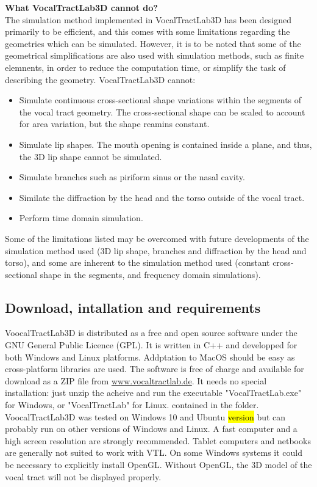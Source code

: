 \documentclass[]{article}
\begin{document}
	\textbf{What VocalTractLab3D cannot do?} \\
	The simulation method implemented in VocalTractLab3D has been 
	designed primarily to be efficient, and this comes with some 
	limitations regarding the geometries which can be simulated.
	However, it is to be noted that some of the geometrical simplifications are also used with simulation methods, such as finite
	elemnents, in order to reduce the computation time, or simplify the task of describing the geometry.
	VocalTractLab3D cannot:
	\begin{itemize}
		\item Simulate continuous cross-sectional shape variations within the segments of the vocal tract geometry. The cross-sectional shape can be scaled to account for area variation, but the shape reamins constant.
		\item Simulate lip shapes. The mouth opening is contained 
		inside a plane, and thus, the 3D lip shape cannot be simulated.
		\item Simulate branches such as piriform sinus or the nasal 
		cavity.
		\item Similate the diffraction by the head and the torso outside
		of the vocal tract.
		\item Perform time domain simulation.
	\end{itemize}
	Some of the limitations listed may be overcomed with future developments of the simulation method used (3D lip shape, branches 
	and diffraction by the head and torso), and some are inherent to 
	the simulation method used (constant cross-sectional shape in the 
	segments, and frequency domain simulations).
	
	\subsection{Download, intallation and requirements}
	
	VoocalTractLab3D is distributed as a free and open source software under the
	GNU General Public Licence (GPL).
	It is written in C++ and developped for both Windows and Linux platforms.
	Addptation to MacOS should be easy as cross-platform libraries are used.
	The software is free of charge and available for download as a ZIP file from
	\url{www.vocaltractlab.de}.
	It needs no special installation: just unzip the acheive and run the executable
	"VocalTractLab.exe" for Windows, or "VocalTractLab" for Linux. 
	contained in the folder.
	VoocalTractLab3D was tested on Windows 10 and Ubuntu \hl{version} but can probably 
	run on other versions of Windows and Linux.
	A fast computer and a high screen resolution are strongly recommended. 
	Tablet computers and netbooks are generally not suited to work with VTL. 
	On some Windows systems it could be necessary to explicitly install OpenGL. 
	Without OpenGL, the 3D model of the vocal tract will not
	be displayed properly.
	
\end{document}
